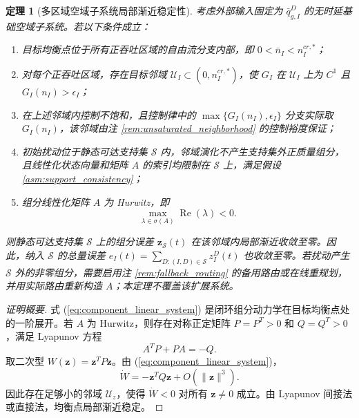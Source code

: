 \documentclass[a4paper,12pt]{article}
\theoremstyle{plain}
\newtheorem{theorem}{定理}[section]
\theoremstyle{definition}
\theoremstyle{remark}
\begin{document}
\begin{theorem}[多区域空域子系统局部渐近稳定性]\label{thm:multi_region_stability}
考虑外部输入固定为 $\bar q_{g,I}^D$ 的无时延基础空域子系统。若以下条件成立：
\begin{enumerate}
    \item 目标均衡点位于所有正吞吐区域的自由流分支内部，即 $0<\bar n_I<n_I^{cr,*}$；
    \item 对每个正吞吐区域，存在目标邻域 $\mathcal U_I\subset(0,n_I^{cr,*})$，使 $G_I$ 在 $\mathcal U_I$ 上为 $C^1$ 且 $G_I(n_I)>\epsilon_I$；
    \item 在上述邻域内控制不饱和，且控制律中的 $\max\{G_I(n_I),\epsilon_I\}$ 分支实际取 $G_I(n_I)$，该邻域由注 \ref{rem:unsaturated_neighborhood} 的控制裕度保证；
    \item 初始扰动位于静态可达支持集 $\mathcal S$ 内，邻域演化不产生支持集外正质量组分，且线性化状态向量和矩阵 $A$ 的索引均限制在 $\mathcal S$ 上，满足假设 \ref{asm:support_consistency}；
    \item 组分线性化矩阵 $A$ 为 Hurwitz，即
    \begin{equation}\label{eq:hurwitz_condition}
        \max_{\lambda\in\sigma(A)}\operatorname{Re}(\lambda)<0 .
    \end{equation}
\end{enumerate}
则静态可达支持集 $\mathcal S$ 上的组分误差 $\bm z_{\mathcal S}(t)$ 在该邻域内局部渐近收敛至零。因此，纳入 $\mathcal S$ 的总量误差 $e_I(t)=\sum_{D:(I,D)\in\mathcal S} z_I^D(t)$ 也收敛至零。若扰动产生 $\mathcal S$ 外的非零组分，需要启用注 \ref{rem:fallback_routing} 的备用路由或在线重规划，并用实际路由重新构造 $A$；本定理不覆盖该扩展系统。
\end{theorem}

\begin{proof}[证明概要]
式 (\ref{eq:component_linear_system}) 是闭环组分动力学在目标均衡点处的一阶展开。若 $A$ 为 Hurwitz，则存在对称正定矩阵 $P=P^T>0$ 和 $Q=Q^T>0$，满足 Lyapunov 方程
\begin{equation}\label{eq:component_lyapunov}
    A^T P+PA=-Q .
\end{equation}
取二次型 $W(\bm z)=\bm z^T P\bm z$。由 (\ref{eq:component_linear_system})，
\begin{equation}
    \dot W
    =
    -\bm z^T Q\bm z+O(\|\bm z\|^3).
\end{equation}
因此存在足够小的邻域 $\mathcal U_z$，使得 $\dot W<0$ 对所有 $\bm z\ne0$ 成立。由 Lyapunov 间接法或直接法，均衡点局部渐近稳定。
\end{proof}
\end{document}
